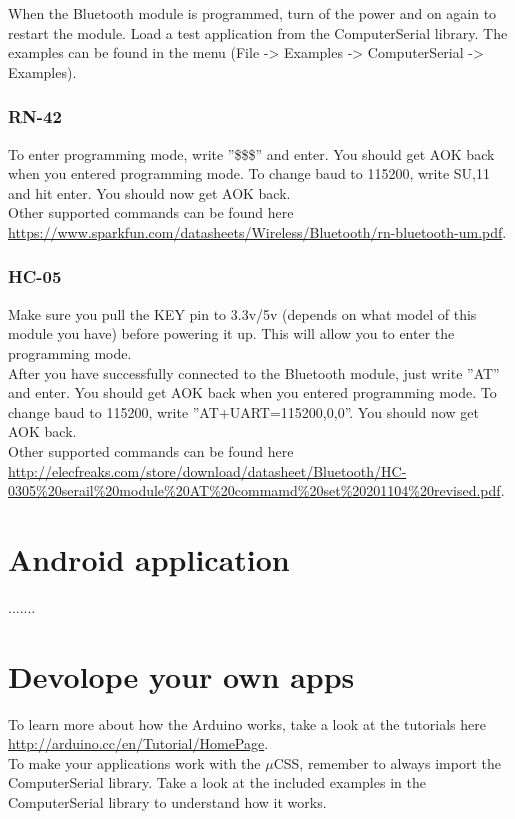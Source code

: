 			When the Bluetooth module is programmed, turn of the power and on again to restart the module. Load a test application from the ComputerSerial library. The examples can be found in the menu (File -> Examples -> ComputerSerial -> Examples).
			
				\subsubsection{RN-42}
				To enter programming mode, write ''\$\$\$'' and enter. You should get AOK back when you entered programming mode. To change baud to 115200, write SU,11 and hit enter. You should now get AOK back.\\
				
				Other supported commands can be found here \url{https://www.sparkfun.com/datasheets/Wireless/Bluetooth/rn-bluetooth-um.pdf}.

				\subsubsection{HC-05}
				Make sure you pull the KEY pin to 3.3v/5v (depends on what model of this module you have) before powering it up. This will allow you to enter the programming mode.\\
				
				After you have successfully connected to the Bluetooth module, just write ''AT'' and enter. You should get AOK back when you entered programming mode. To change baud to 115200, write ''AT+UART=115200,0,0''. You should now get AOK back.\\
				
				Other supported commands can be found here \url{http://elecfreaks.com/store/download/datasheet/Bluetooth/HC-0305%20serail%20module%20AT%20commamd%20set%20201104%20revised.pdf}.
				
	\section{Android application}\label{sec:install-android-application}
	.......
	
	\section{Devolope your own apps}
	To learn more about how the Arduino works, take a look at the tutorials here \url{http://arduino.cc/en/Tutorial/HomePage}.\\
	
	To make your applications work with the $\mu$CSS, remember to always import the ComputerSerial library. Take a look at the included examples in the ComputerSerial library to understand how it works.
